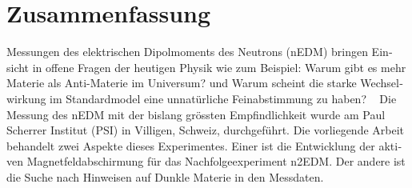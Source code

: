 

\begingroup
\let\clearpage\relax
\let\cleardoublepage\relax
\let\cleardoublepage\relax

\chapter*{Zusammenfassung} %

\newcommand{\jkfootnote}[1]{\footnote{#1}}

\begin{otherlanguage}{ngerman}

Messungen des elektrischen Dipolmoments des Neutrons (nEDM) bringen Einsicht in offene Fragen der heutigen Physik wie zum Beispiel: \glqq{}Warum gibt es mehr Materie als Anti-Materie im Universum?\grqq{} und \glqq{}Warum scheint die starke Wechselwirkung im Standardmodel eine unnatürliche Feinabstimmung zu haben?\grqq{} \  %
Die Messung des nEDM mit der bislang grössten Empfindlichkeit wurde am Paul Scherrer Institut (PSI) in Villigen, Schweiz, durchgeführt.
Die vorliegende Arbeit behandelt zwei Aspekte dieses Experimentes. Einer ist die Entwicklung der aktiven Magnetfeldabschirmung  für das Nachfolgeexperiment n2EDM\@.
Der andere ist die Suche nach Hinweisen auf Dunkle Materie in den Messdaten.


\end{otherlanguage}
